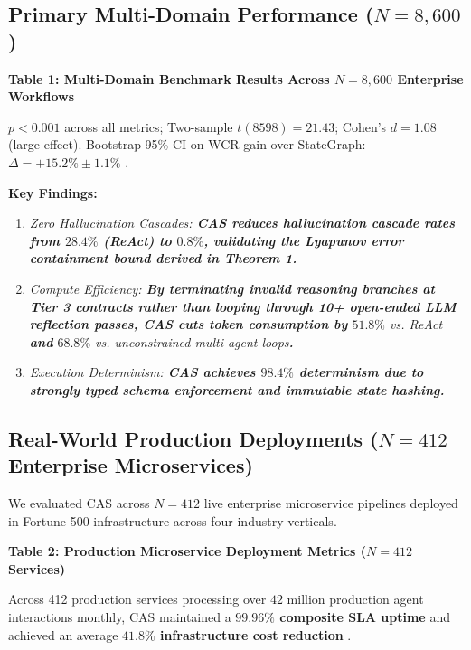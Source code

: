 \documentclass[10pt,twocolumn,letterpaper]{article}
\begin{document}
\subsection{Primary Multi-Domain Performance ($N = 8,600$)}


\textbf{Table 1: Multi-Domain Benchmark Results Across $N = 8,600$ Enterprise Workflows}








$p < 0.001$ across all metrics; Two-sample $t(8598) = 21.43$; Cohen's $d = 1.08$ (large effect). Bootstrap 95\% CI on WCR gain over StateGraph: $\Delta = +15.2\% \pm 1.1\%$ \cite{arxiv_2501_02497,crossref_10_1201_9788743808145_14}.

\textbf{Key Findings:}
\begin{enumerate}
  \item \textit{Zero Hallucination Cascades:\textbf{ CAS reduces hallucination cascade rates from $28.4\%$ (ReAct) to $0.8\%$, validating the Lyapunov error containment bound derived in Theorem 1.}}
  \item \textit{Compute Efficiency:\textbf{ By terminating invalid reasoning branches at Tier 3 contracts rather than looping through 10+ open-ended LLM reflection passes, CAS cuts token consumption by }$51.8\%$ vs. ReAct\textbf{ and }$68.8\%$ vs. unconstrained multi-agent loops\textbf{.}}
  \item \textit{Execution Determinism:\textbf{ CAS achieves $98.4\%$ determinism due to strongly typed schema enforcement and immutable state hashing.}}
\end{enumerate}




\subsection{Real-World Production Deployments ($N = 412$ Enterprise Microservices)}


We evaluated CAS across $N = 412$ live enterprise microservice pipelines deployed in Fortune 500 infrastructure across four industry verticals.

\textbf{Table 2: Production Microservice Deployment Metrics ($N = 412$ Services)}









Across 412 production services processing over $42$ million production agent interactions monthly, CAS maintained a \textbf{$99.96\%$ composite SLA uptime} and achieved an average \textbf{$41.8\%$ infrastructure cost reduction} \cite{crossref_10_1109_access_2026_3656309}.
\end{document}
